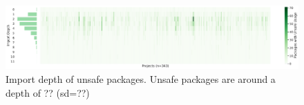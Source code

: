 \begin{figure}[htp!]
    \centering
    \includegraphics[width=\textwidth]{assets/plots/chapter4/unsafe-import-depth.pdf}
    \caption{Import depth of unsafe packages. Unsafe packages are around a depth of ?? (sd=??)}
    \label{fig:unsafe-import-depth}
\end{figure}
